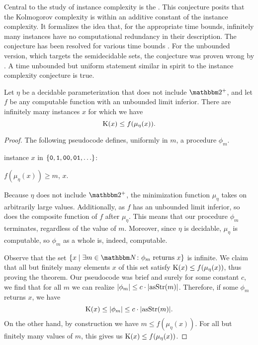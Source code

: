 Central to the study of instance complexity is the  \parencite{orponen1994instance}.
This conjecture posits that the Kolmogorov complexity is within an additive constant of the instance complexity.
It formalizes the idea that, for the appropriate time bounds, infinitely many instances have no computational redundancy in their description.
The conjecture has been resolved for various time bounds \parencite{fortnow1996resource,buhrman1996random}.
For the unbounded version, which targets the semidecidable sets, the conjecture was proven wrong by \textcite{kummer1996kolmogorov}.
A time unbounded but uniform statement similar in spirit to the instance complexity conjecture is true.
\begin{theorem}
\label{thm:parameterizedicc}
  Let $\eta$ be a decidable parameterization that does not include $\binary^+$, and let $f$ be any computable function with an unbounded limit inferior.
  There are infinitely many instances $x$ for which we have
  \begin{equation*}
    \operatorname{K}(x) \le f(\mu_\eta(x)).
  \end{equation*}
\end{theorem}
\begin{proof}
  The following pseudocode defines, uniformly in $m$, a procedure $\phi_m$.
  \begin{codelisting}
  \item
     instance $x$ in $\{\bits{0}, \bits{1}, \bits{00}, \bits{01}, \ldots\}$:
    \begin{codelisting}
      \item {} $f(\mu_\eta(x)) \ge m$,  $x$.
    \end{codelisting}
  \end{codelisting}

  Because $\eta$ does not include $\binary^+$, the minimization function $\mu_\eta$ takes on arbitrarily large values.
  Additionally, as $f$ has an unbounded limit inferior, so does the composite function of $f$ after $\mu_\eta$.
  This means that our procedure $\phi_m$ terminates, regardless of the value of $m$.
  Moreover, since $\eta$ is decidable, $\mu_\eta$ is computable, so $\phi_m$ as a whole is, indeed, computable.

  Observe that the set $\{x \st \exists m \in \bbN\colon \text{$\phi_m$ returns $x$}\}$ is infinite.
  We claim that all but finitely many elements $x$ of this set satisfy $\operatorname{K}(x) \le f(\mu_\eta(x))$, thus proving the theorem.
  Our pseudocode was brief and surely for some constant $c$, we find that for all $m$ we can realize ${\lvert\phi_m\rvert} \le c \cdot {\lvert\operatorname{asStr}(m)\rvert}$.
  Therefore, if some $\phi_m$ returns $x$, we have
  \begin{equation*}
    \operatorname{K}(x) \le {\lvert\phi_m\rvert} \le c \cdot {\lvert\operatorname{asStr}(m)\rvert}.
  \end{equation*}
  On the other hand, by construction we have $m \le f(\mu_\eta(x))$.
  For all but finitely many values of $m$, this gives us $\operatorname{K}(x) \le f(\mu_\eta(x))$.
\end{proof}

